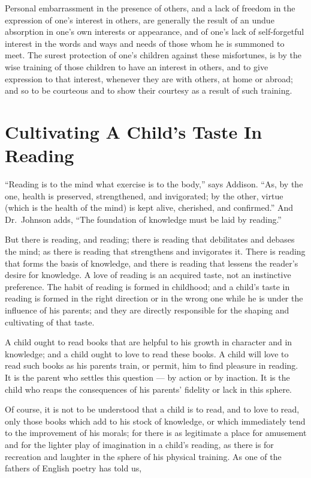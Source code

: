 \documentclass[
]{book}
\begin{document}
Personal embarrassment in the presence of others, and a lack of freedom in the expression of one's interest in others, are generally the result of an undue absorption in one's own interests or appearance, and of one's lack of self-forgetful interest in the words and ways and needs of those whom he is summoned to meet. The surest protection of one's children against these misfortunes, is by the wise training of those children to have an interest in others, and to give expression to that interest, whenever they are with others, at home or abroad; and so to be courteous and to show their courtesy as a result of such training.

\hypertarget{cultivating-a-childs-taste-in-reading}{%
\chapter{Cultivating A Child's Taste In Reading}\label{cultivating-a-childs-taste-in-reading}}

``Reading is to the mind what exercise is to the body,'' says Addison. ``As, by the one, health is preserved, strengthened, and invigorated; by the other, virtue (which is the health of the mind) is kept alive, cherished, and confirmed.'' And Dr.~Johnson adds, ``The foundation of knowledge must be laid by reading.''

But there is reading, and reading; there is reading that debilitates and debases the mind; as there is reading that strengthens and invigorates it. There is reading that forms the basis of knowledge, and there is reading that lessens the reader's desire for knowledge. A love of reading is an acquired taste, not an instinctive preference. The habit of reading is formed in childhood; and a child's taste in reading is formed in the right direction or in the wrong one while he is under the influence of his parents; and they are directly responsible for the shaping and cultivating of that taste.

A child ought to read books that are helpful to his growth in character and in knowledge; and a child ought to love to read these books. A child will love to read such books as his parents train, or permit, him to find pleasure in reading. It is the parent who settles this question --- by action or by inaction. It is the child who reaps the consequences of his parents' fidelity or lack in this sphere.

Of course, it is not to be understood that a child is to read, and to love to read, only those books which add to his stock of knowledge, or which immediately tend to the improvement of his morals; for there is as legitimate a place for amusement and for the lighter play of imagination in a child's reading, as there is for recreation and laughter in the sphere of his physical training. As one of the fathers of English poetry has told us,
\end{document}
